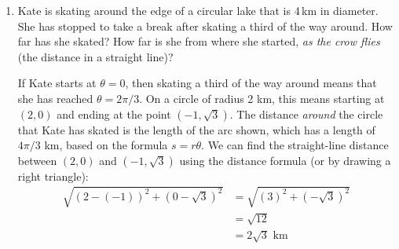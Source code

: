 \documentclass[main]{subfiles}
\begin{document}
\begin{enumerate}
\begin{center}
\begin{tabular}{cc}
\begin{tikzpicture}
  \end{tikzpicture}
\end{tabular}
\end{center}

\item 
\begin{problem}
    Kate is skating around the edge of a circular lake that is 4\,km in diameter. She has stopped to take a break after skating a third of the way around. How far has she skated? How far is she from where she started, \emph{as the crow flies} (the distance in a straight line)?
\end{problem}
\pspace{\vfill}

\begin{solution}
If Kate starts at $\theta=0$, then skating a third of the way around means that she has reached $\theta=2\pi/3$. On a circle of radius 2 km, this means starting at $(2,0)$ and ending at the point $({-1},\sqrt{3})$. The distance \emph{around} the circle that Kate has skated is the length of the arc shown, which has a length of $4\pi/3$ km, based on the formula $s=r\theta$. We can find the straight-line distance between $(2,0)$ and $({-1},\sqrt{3})$ using the distance formula (or by drawing a right triangle):
\begin{align*}
    \sqrt{(2-(-1))^2+(0-\sqrt{3})^2} &= \sqrt{(3)^2+(-\sqrt{3})^2} \\
    &= \sqrt{12} \\
    &= 2\sqrt{3}\text{ km}
\end{align*}
\begin{center}
\end{center}
\end{solution}
\end{enumerate}
\end{document}
